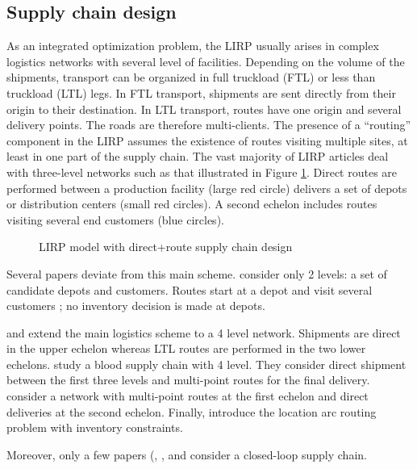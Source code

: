 \documentclass[a4paper,10pt]{article}
\begin{document}
\begin{linenumbers}
\subsection{Supply chain design}
\label{sec:l} 

As an integrated optimization problem, the LIRP usually arises in complex logistics networks with several level of facilities. 
Depending on the volume of the shipments, transport can be organized in full truckload (FTL) or less than truckload (LTL) legs. 
In FTL transport, shipments are sent directly from their origin to their destination. In LTL transport, routes have one origin and several delivery points. The roads are therefore multi-clients. The presence of a ``routing'' component in the LIRP assumes the existence of routes visiting multiple sites, at least in one part of the supply chain.
The vast majority of LIRP articles deal with three-level networks such as that illustrated in Figure \ref{fig:directloop}. 
Direct routes are performed between a production facility (large red circle) delivers a set of depots or distribution centers (small red circles). A second echelon includes routes visiting several end customers (blue circles).

\begin{figure}[htbp]
	\centering
	\caption{LIRP model with direct+route supply chain design}
		\label{fig:directloop}
	\end{figure}

Several papers deviate from this main scheme.  \cite{Zhang2014} consider only 2 levels: a set of candidate depots and customers. Routes start at a depot and visit several customers ; no inventory decision is made at depots. 

\cite{AmbScu05} and \cite{Tavana2018} extend the main logistics scheme to a 4 level network. Shipments are direct in the upper echelon whereas LTL routes are performed in the two lower echelons. 
\cite{Eskandari2018} study a blood supply chain with 4 level. They consider direct shipment between the first three levels and multi-point routes for the final delivery. 
\cite{Bashiri2018} consider a network with multi-point routes at the first echelon and direct deliveries at the second echelon. 
Finally, \cite{Riquelme2016} introduce the location arc routing problem with inventory constraints. 

Moreover, only a few papers (\cite{LiuChenLiLiu2015}, \cite{Deng2016}, \cite{Zhalechian2016} and \cite{LiGuoWangFu2013} 
consider a closed-loop supply chain. 



\end{linenumbers}
\end{document}
